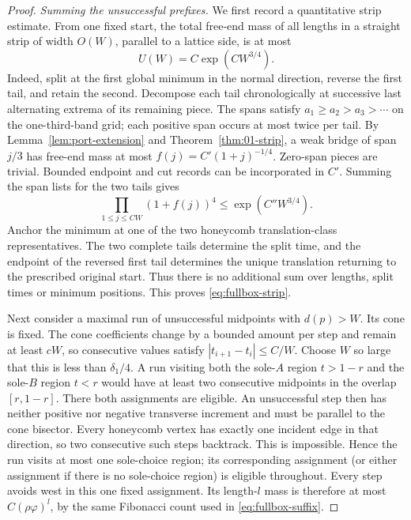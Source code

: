 \begin{proof}
\smallskip\noindent\emph{Summing the unsuccessful prefixes.}
We first record a quantitative strip estimate. From one fixed start,
the total free-end mass of all lengths in a straight strip of width
\(O(W)\), parallel to a lattice side, is at most
\begin{equation}\label{eq:fullbox-strip}
 U(W)=C\exp(CW^{3/4}).
\end{equation}
Indeed, split at the first global minimum in the normal direction,
reverse the first tail, and retain the second. Decompose each tail
chronologically at successive last alternating extrema of its remaining
piece. The spans satisfy \(a_1\ge a_2>a_3>\cdots\) on the
one-third-band grid; each positive span occurs at most twice per tail.
By Lemma~\ref{lem:port-extension} and Theorem~\ref{thm:01-strip}, a weak
bridge of span \(j/3\) has free-end mass at most
\(f(j)=C'(1+j)^{-1/4}\). Zero-span pieces are trivial. Bounded endpoint
and cut records can be incorporated in \(C'\). Summing the span lists
for the two tails gives
\[
 \prod_{1\le j\le CW}(1+f(j))^4\le\exp(C''W^{3/4}).
\]
Anchor the minimum at one of the two honeycomb translation-class
representatives. The two complete tails determine the split time, and
the endpoint of the reversed first tail determines the unique translation
returning to the prescribed original start. Thus there is no additional
sum over lengths, split times or minimum positions. This proves
\eqref{eq:fullbox-strip}.

Next consider a maximal run of unsuccessful midpoints with \(d(p)>W\).
Its cone is fixed. The cone coefficients change by a bounded amount per
step and remain at least \(cW\), so consecutive values satisfy
\( |t_{i+1}-t_i|\le C/W\). Choose \(W\) so large that this is less
than \(\delta_1/4\). A run visiting both the sole-\(A\) region
\(t>1-r\) and the sole-\(B\) region \(t<r\) would have at least two
consecutive midpoints in the overlap \([r,1-r]\). There both assignments
are eligible. An unsuccessful step then has neither positive nor negative
transverse increment and must be parallel to the cone bisector. Every
honeycomb vertex has exactly one incident edge in that direction, so two
consecutive such steps backtrack. This is impossible. Hence the run
visits at most one sole-choice region; its corresponding assignment
(or either assignment if there is no sole-choice region) is eligible
throughout. Every step avoids west in this one fixed assignment. Its
length-\(l\) mass is therefore at most \(C(\rho\varphi)^l\), by the
same Fibonacci count used in \eqref{eq:fullbox-suffix}.


\end{proof}
